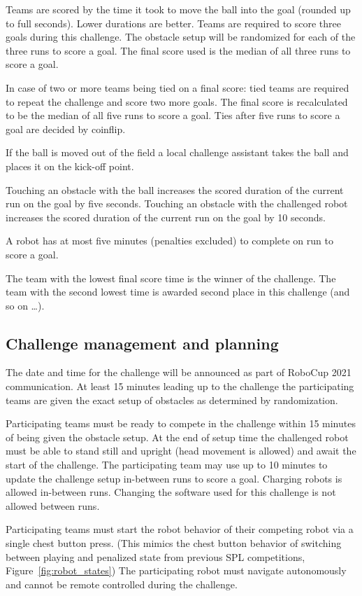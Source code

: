 Teams are scored by the time it took to move the ball into the goal (rounded up to full seconds). Lower durations are better. Teams are required to score three goals during this challenge. The obstacle setup will be randomized for each of the three runs to score a goal. The final score used is the median of all three runs to score a goal. 

In case of two or more teams being tied on a final score: tied teams are required to repeat the challenge and score two more goals. The final score is recalculated to be the median of all five runs to score a goal. Ties after five runs to score a goal are decided by coinflip.

If the ball is moved out of the field a local challenge assistant takes the ball and places it on the kick-off point.

Touching an obstacle with the ball increases the scored duration of the current run on the goal by five seconds. Touching an obstacle with the challenged robot increases the scored duration of the current run on the goal by 10 seconds.

A robot has at most five minutes (penalties excluded) to complete on run to score a goal.

The team with the lowest final score time is the winner of the challenge. The team with the second lowest time is awarded second place in this challenge (and so on \ldots).

\subsection{Challenge management and planning}

The date and time for the challenge will be announced as part of RoboCup 2021 communication. At least 15 minutes leading up to the challenge the participating teams are given the exact setup of obstacles as determined by randomization.

Participating teams must be ready to compete in the challenge within 15 minutes of being given the obstacle setup. At the end of setup time the challenged robot must be able to stand still and upright (head movement is allowed) and await the start of the challenge. The participating team may use up to 10 minutes to update the challenge setup in-between runs to score a goal. Charging robots is allowed in-between runs. Changing the software used for this challenge is not allowed between runs.

Participating teams must start the robot behavior of their competing robot via a single chest button press. (This mimics the chest button behavior of switching between playing and penalized state from previous SPL competitions, \cf Figure~\ref{fig:robot_states}) The participating robot must navigate autonomously and cannot be remote controlled during the challenge.

